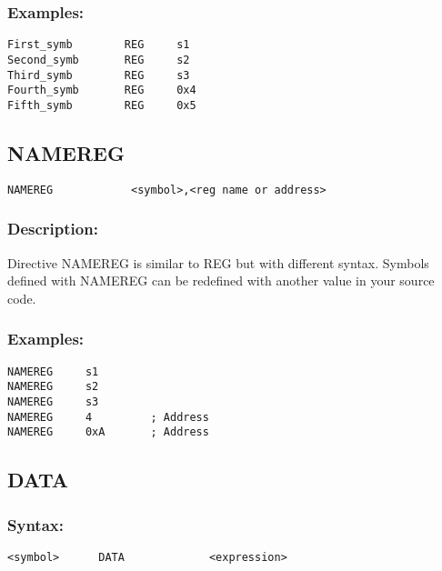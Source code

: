         \subsubsection{Examples:}
            {
                \usecodefont
                \verb'First_symb        REG     s1'\\
                \verb'Second_symb       REG     s2'\\
                \verb'Third_symb        REG     s3'\\
                \verb'Fourth_symb       REG     0x4'\\
                \verb'Fifth_symb        REG     0x5'\\
            }

        \subsection{NAMEREG}
            {
                \usecodefont
                \verb'NAMEREG            <symbol>,<reg name or address> '
            }

        \subsubsection{Description:}
            Directive NAMEREG is similar to REG but with different syntax. Symbols defined with NAMEREG can be redefined with another value in your source code.

        \subsubsection{Examples:}
            {
                \usecodefont
                \verb'NAMEREG     s1'\\
                \verb'NAMEREG     s2'\\
                \verb'NAMEREG     s3'\\
                \verb'NAMEREG     4         ; Address'\\
                \verb'NAMEREG     0xA       ; Address'\\
            }

    \subsection{DATA}
        \subsubsection{Syntax:}
            {
                \usecodefont
                \verb'<symbol>      DATA             <expression>'
            }

